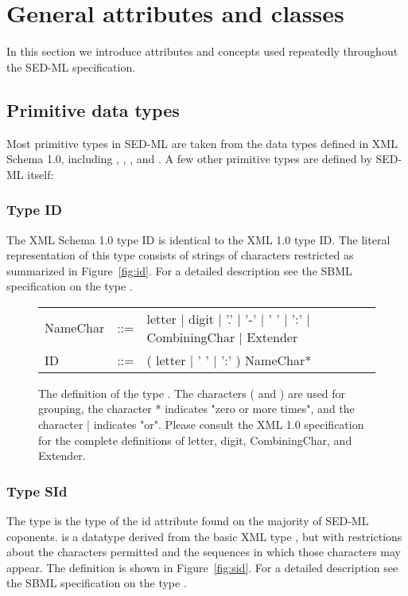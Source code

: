 \pagebreak

\section{General attributes and classes}
In this section we introduce attributes and concepts used repeatedly throughout the SED-ML specification. 


\subsection{Primitive data types}
Most primitive types in SED-ML are taken from the data types defined in XML Schema 1.0, including , , ,  and . A few other primitive types are defined by SED-ML itself: 

\subsubsection{Type ID}
\label{type:id}
The XML Schema 1.0 type ID is identical to the XML 1.0 type ID. The literal representation of this type consists of strings of characters restricted as summarized in Figure~\vref{fig:id}. For a detailed description see the SBML specification on the type  \citep{HBH+10}.

\begin{figure}[hbt]
  \ttfamily
  \small
  \centering
  \begin{tabular}{lll}
    NameChar & ::= & letter | digit | '.' | '-' | ' ' | ':' | CombiningChar | Extender\\
    ID    & ::= & ( letter | ' ' | ':' ) NameChar*\\
  \end{tabular}
  \vspace*{-1ex}
  \caption{The definition of the type . The characters ( and ) are used for grouping, the character * indicates "zero or more times", and the character | indicates "or". Please consult the XML 1.0 specification for the complete definitions of letter, digit, CombiningChar, and Extender.}
  \label{fig:id}
\end{figure}

\subsubsection{Type SId}
\label{type:sid}
The type  is the type of the id attribute found on the majority of SED-ML coponents.  is a datatype derived from the basic XML type , but with restrictions about the characters permitted and the sequences in which those characters may appear. The definition is shown in Figure~\vref{fig:sid}. For a detailed description see the SBML specification on the type  \citep{HBH+10}.

